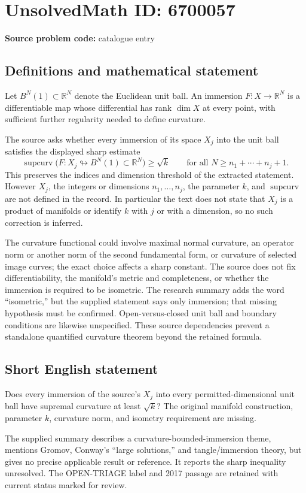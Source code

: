 \documentclass[11pt]{article}
\newcommand{\R}{\mathbb{R}}
\begin{document}
\section*{UnsolvedMath ID: 6700057}
\textbf{Source problem code:} catalogue entry
\subsection{Definitions and mathematical statement}
Let $B^N(1)\subset\R^N$ denote the Euclidean unit ball. An immersion $F:X\to\R^N$ is a differentiable map whose differential has rank $\dim X$ at every point, with sufficient further regularity needed to define curvature.

The source asks whether every immersion of its space $X_j$ into the unit ball satisfies the displayed sharp estimate
\[
 \operatorname{supcurv}\bigl(F:X_j\looparrowright
                  B^N(1)\subset\R^N\bigr)\ge\sqrt{k}
 \qquad\text{for all }N\ge n_1+\cdots+n_j+1.
\]
This preserves the indices and dimension threshold of the extracted statement. However $X_j$, the integers or dimensions $n_1,\ldots,n_j$, the parameter $k$, and $\operatorname{supcurv}$ are not defined in the record. In particular the text does not state that $X_j$ is a product of manifolds or identify $k$ with $j$ or with a dimension, so no such correction is inferred.

The curvature functional could involve maximal normal curvature, an operator norm or another norm of the second fundamental form, or curvature of selected image curves; the exact choice affects a sharp constant. The source does not fix differentiability, the manifold's metric and completeness, or whether the immersion is required to be isometric. The research summary adds the word ``isometric,'' but the supplied statement says only immersion; that missing hypothesis must be confirmed. Open-versus-closed unit ball and boundary conditions are likewise unspecified. These source dependencies prevent a standalone quantified curvature theorem beyond the retained formula.
\subsection{Short English statement}
Does every immersion of the source's $X_j$ into every permitted-dimensional unit ball have supremal curvature at least $\sqrt k$? The original manifold construction, parameter $k$, curvature norm, and isometry requirement are missing.

The supplied summary describes a curvature-bounded-immersion theme, mentions Gromov, Conway's ``large solutions,'' and tangle/immersion theory, but gives no precise applicable result or reference. It reports the sharp inequality unresolved. The OPEN-TRIAGE label and 2017 passage are retained with current status marked for review.
\end{document}
